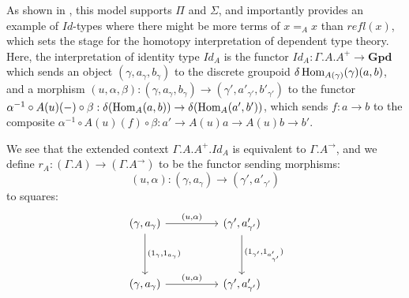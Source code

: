 As shown in \cite{hofmann1998}, this model supports $\Pi$ and $\Sigma$, and importantly provides an example of $Id$-types where there might be more terms of $x =_A x$ than $refl(x)$, which sets the stage for the homotopy interpretation of dependent type theory. Here, the interpretation of identity type $Id_A$ is the functor $Id_A : \Gamma.A.A^+ \to \mathbf{Gpd}$ which sends an object $(\gamma, a_\gamma, b_\gamma)$ to the discrete groupoid $\delta \operatorname{\text{Hom}}_{A(\gamma)}(\gamma)(a,b)$, and a morphism $(u, \alpha, \beta) : (\gamma, a_{\gamma}, b_\gamma) \to (\gamma', a'_{\gamma'}, b'_{\gamma'})$ to the functor $\alpha^{-1} \circ A(u)(-) \circ \beta : \delta(\operatorname{\text{Hom}}_A(a, b)) \to \delta(\operatorname{\text{Hom}}_A(a',b'))$, which sends $f : a \to b$ to the composite $\alpha^{-1}\circ A(u)(f) \circ \beta : a' \to A(u)a \to A(u)b \to b'$.

We see that the extended context $\Gamma.A.A^+.Id_A$ is equivalent to $\Gamma.A^\to$, and we define $r_A : (\Gamma.A) \to (\Gamma.A^\to)$ to be the functor sending morphisms:
\[
  (u, \alpha) : (\gamma, a_\gamma) \to (\gamma', a'_{\gamma'})
\]
to squares:
\[
  \ti
  (\gamma, a_\gamma) \ar[r, "{(u, \alpha)}"] \ar[d, "{(1_{\gamma}, 1_{a_\gamma})}"] &   (\gamma', a'_{\gamma'}) \ar[d, "{(1_{\gamma'}, 1_{a'_{\gamma'}})}"]\\
    (\gamma, a_\gamma) \ar[r, "{(u, \alpha)}"] & (\gamma', a'_{\gamma'})
  \kz
\]

